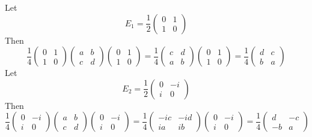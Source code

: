 Let 
\begin{equation}
    E_1 = \frac{1}{2}\begin{pmatrix}0 & 1 \\ 1 & 0\end{pmatrix}
\end{equation}
Then 
\begin{equation}
    \frac{1}{4}\begin{pmatrix}0 & 1\\ 1 & 0\end{pmatrix}  \begin{pmatrix}a & b \\ c & d\end{pmatrix} \begin{pmatrix}0 & 1 \\ 1 & 0\end{pmatrix}  = \frac{1}{4} \begin{pmatrix}c & d \\ a & b\end{pmatrix} \begin{pmatrix}0 & 1 \\ 1 & 0\end{pmatrix} = \frac{1}{4} \begin{pmatrix}d & c \\ b & a\end{pmatrix}
\end{equation}
Let 
\begin{equation}
    E_2 = \frac{1}{2}\begin{pmatrix}0 & -i \\ i & 0\end{pmatrix}
\end{equation}
Then 
\begin{equation}
    \frac{1}{4}\begin{pmatrix}0 & -i\\ i & 0\end{pmatrix}  \begin{pmatrix}a & b \\ c & d\end{pmatrix} \begin{pmatrix}0 & -i \\ i & 0\end{pmatrix}  = \frac{1}{4} \begin{pmatrix}-ic & -id \\ ia & ib\end{pmatrix} \begin{pmatrix}0 & -i \\ i & 0\end{pmatrix} = \frac{1}{4} \begin{pmatrix}d & -c \\ -b & a\end{pmatrix}
\end{equation}
